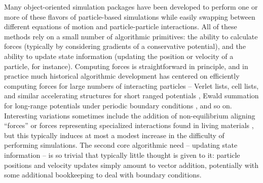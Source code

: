 \documentclass[preprint,12pt]{elsarticle}
\begin{document}
Many object-oriented simulation packages have been developed to perform one or more of these flavors of particle-based simulations while easily swapping between different equations of motion and particle-particle interactions. All of these methods rely on a small number of algorithmic primitives: the ability to calculate forces (typically by considering gradients of a conservative potential), and the ability to update state information (updating the position or velocity of a particle, for instance). Computing forces is straightforward in principle, and in practice much historical algorithmic development has centered on efficiently computing forces for large numbers of interacting particles -- Verlet lists, cell lists, and similar accelerating structures for short ranged potentials  \cite{howard2016efficient}, Ewald summation for long-range potentials under periodic boundary conditions \cite{toukmaji1996ewald}, and so on. Interesting variations sometimes include the addition of non-equilibrium aligning ``forces'' \cite{vicsek1995novel, gregoire2004onset, cavagna2015flocking} or forces representing specialized interactions found in living materials  \cite{dombrowski2004self,sussman2017cellgpu, vuijk2021chemotaxis}, but this typically induces at most a  modest increase in the difficulty of performing simulations. The second core algorithmic need -- updating state information -- is so trivial that typically little thought is given to it: particle positions and velocity updates simply amount to vector addition, potentially with some  additional bookkeeping to deal with boundary conditions.
\end{document}
